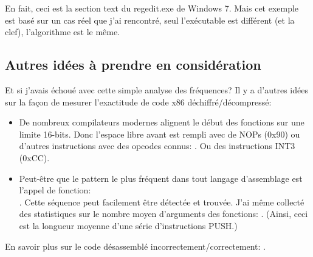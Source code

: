 En fait, ceci est la section text du regedit.exe de Windows 7.
Mais cet exemple est basé sur un cas réel que j'ai rencontré, seul l'exécutable est
différent (et la clef), l'algorithme est le même.

\subsection{Autres idées à prendre en considération}

Et si j'avais échoué avec cette simple analyse des fréquences?
Il y a d'autres idées sur la façon de mesurer l'exactitude de code x86 déchiffré/décompressé:

\begin{itemize}

\item De nombreux compilateurs modernes alignent le début des fonctions sur une limite 16-bits.
Donc l'espace libre avant est rempli avec de NOPs (0x90) ou d'autres instructions
avec des opcodes connus: .
Ou des instructions INT3 (0xCC).

\item Peut-être que le pattern le plus fréquent dans tout langage d'assemblage est
l'appel de fonction:\\
.
Cette séquence peut facilement être détectée et trouvée.
J'ai même collecté des statistiques sur le nombre moyen d'arguments des fonctions: .
(Ainsi, ceci est la longueur moyenne d'une série d'instructions PUSH.)

\end{itemize}

En savoir plus sur le code désassemblé incorrectement/correctement: .

